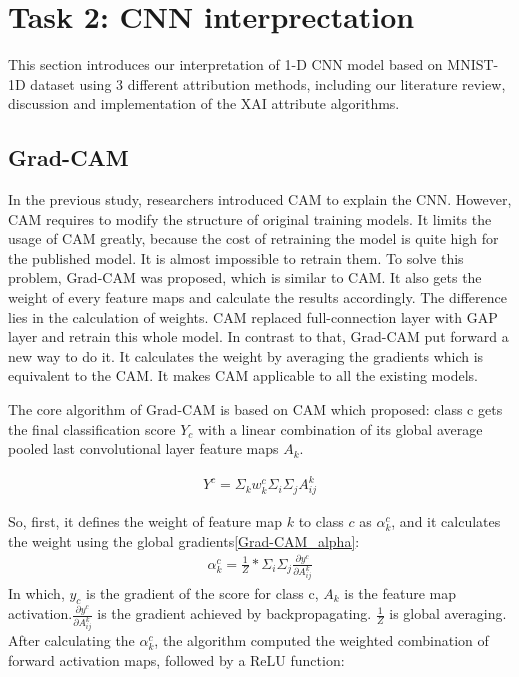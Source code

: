 \documentclass[conference]{IEEEtran}
\begin{document}
\section{Task 2: CNN interprectation}

This section introduces our interpretation of 1-D CNN model based on MNIST-1D dataset using 3 different attribution methods, including our literature review, discussion and implementation of the XAI attribute algorithms.

\subsection{Grad-CAM}
In the previous study, researchers introduced CAM to explain the CNN. However, CAM requires to modify the structure of original training models. It limits the usage of CAM greatly, because the cost of retraining the model is quite high for the published model. It is almost impossible to retrain them.
To solve this problem, Grad-CAM was proposed, which is similar to CAM. It also gets the weight of every feature maps and calculate the results accordingly. The difference lies in the calculation of weights. CAM replaced full-connection layer with GAP layer and retrain this whole model. In contrast to that, Grad-CAM put forward a new way to do it.
It calculates the weight by averaging the gradients which is equivalent to the CAM. It makes CAM applicable to all the existing models.\par

The core algorithm of Grad-CAM is based on CAM which proposed: class c gets the final classification score $Y_{c}$ with a linear combination of its global average pooled last convolutional layer feature maps $A_{k}$.

\begin{equation}
    \begin{aligned}
        Y^{c}=\Sigma_{k}w_{k}^{c}\Sigma_{i}\Sigma_{j}A_{ij}^{k}
        \label{Grad-CAM_Y}
    \end{aligned}
  \end{equation}

So, first, it defines the weight of feature map $k$ to class $c$ as $\alpha_{k}^{c}$, and it calculates the weight using the global gradients\ref{Grad-CAM_alpha}:
\begin{equation}
    \begin{aligned}
        \alpha_{k}^{c}=\frac{1}{Z}*\Sigma_{i}\Sigma_{j}\frac{\partial y^{c}}{\partial A_{ij}^{k}}
        \label{Grad-CAM_alpha}
    \end{aligned}
  \end{equation}
  In which, $y_{c}$ is the gradient of the score for class c, $A_{k}$ is the feature map activation.$\frac{\partial y^{c}}{\partial A_{ij}^{k}}$ is the gradient achieved by backpropagating. $\frac{1}{Z}$ is global averaging.
  After calculating the $\alpha_{k}^{c}$, the algorithm computed the weighted combination of forward activation maps, followed by a ReLU function:
\end{document}
